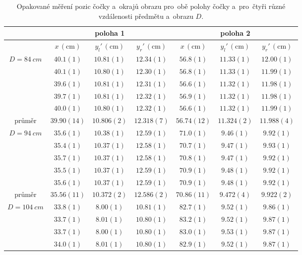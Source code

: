 \documentclass{../concepts/titul_zprava_p/prepareprotokolZprava} %
\begin{document}
\begin{table}[!htbp]
\centering
\caption{Opakované měření pozic čočky a~okrajů obrazu pro~obě polohy čočky a~pro~čtyři různé vzdálenosti předmětu a~obrazu $D$.}
\begin{tabular}{c|ccc|ccc}
 \toprule
  & \multicolumn{3}{c|}{poloha 1} & \multicolumn{3}{c}{poloha 2} \\
 \midrule
  & $x\, (\mathrm{cm})$ & $y_l'\, (\mathrm{cm})$ & $y_r'\, (\mathrm{cm})$ & $x\, (\mathrm{cm})$ & $y_l'\, (\mathrm{cm})$ & $y_r'\, (\mathrm{cm})$ \\
 \midrule
 \multirow{5}{*}{$D=\qty{84}{cm}$} & $40.1(1)$ & $10.81(1)$ & $12.34(1)$ & $56.8(1)$ & $11.33(1)$ & $12.00(1)$ \\
  & $40.1(1)$ & $10.80(1)$ & $12.30(1)$ & $56.8(1)$ & $11.33(1)$ & $11.99(1)$ \\
  & $39.6(1)$ & $10.81(1)$ & $12.31(1)$ & $56.6(1)$ & $11.32(1)$ & $11.98(1)$ \\
  & $39.7(1)$ & $10.81(1)$ & $12.32(1)$ & $56.9(1)$ & $11.32(1)$ & $11.98(1)$ \\
  & $40.0(1)$ & $10.80(1)$ & $12.32(1)$ & $56.6(1)$ & $11.32(1)$ & $11.99(1)$ \\
  \midrule
  průměr & $39.90(14)$ & $10.806(2)$ & $12.318(7)$ & $56.74(12)$ & $11.324(2)$ & $11.988(4)$ \\
  \midrule
  \midrule
  \multirow{5}{*}{$D=\qty{94}{cm}$}& $35.6(1)$ & $10.38(1)$ & $12.59(1)$ & $71.0(1)$ & $9.46(1)$ & $9.92(1)$ \\
  & $35.4(1)$ & $10.37(1)$ & $12.58(1)$ & $70.7(1)$ & $9.47(1)$ & $9.93(1)$ \\
  & $35.7(1)$ & $10.37(1)$ & $12.58(1)$ & $70.8(1)$ & $9.47(1)$ & $9.92(1)$ \\
  & $35.5(1)$ & $10.37(1)$ & $12.59(1)$ & $70.9(1)$ & $9.48(1)$ & $9.92(1)$ \\
  & $35.6(1)$ & $10.37(1)$ & $12.59(1)$ & $70.9(1)$ & $9.48(1)$ & $9.92(1)$ \\
  \midrule
  průměr & $35.56(11)$ & $10.372(2)$ & $12.586(2)$ & $70.86(11)$ & $9.472(4)$ & $9.922(2)$ \\
  \midrule
  \midrule
  \multirow{5}{*}{$D=\qty{104}{cm}$} & $33.8(1)$ & $8.00(1)$ & $10.81(1)$ & $82.7(1)$ & $9.52(1)$ & $9.86(1)$ \\
  & $33.7(1)$ & $8.01(1)$ & $10.80(1)$ & $83.2(1)$ & $9.52(1)$ & $9.87(1)$ \\
  & $33.7(1)$ & $8.00(1)$ & $10.80(1)$ & $83.0(1)$ & $9.53(1)$ & $9.87(1)$ \\
  & $34.0(1)$ & $8.01(1)$ & $10.80(1)$ & $82.9(1)$ & $9.52(1)$ & $9.87(1)$ \\

\end{tabular}
\end{table}
\end{document}
